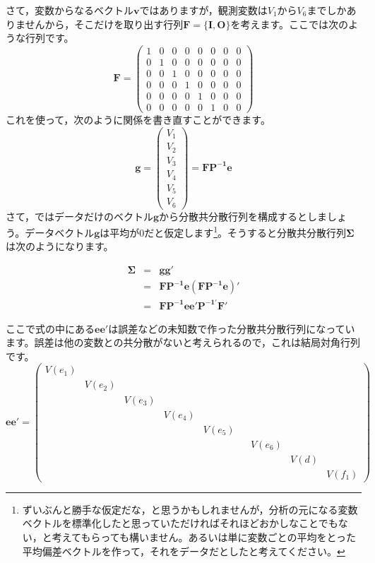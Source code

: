 \documentclass{ltjsbook}
\begin{document}
さて，変数からなるベクトル$\bm{v}$ではありますが，観測変数は$V_1$から$V_6$までしかありませんから，そこだけを取り出す行列$\bm{F}=\{ \bm{I},\bm{O} \}$を考えます。ここでは次のような行列です。
\[
	\bm{F} =
	\begin{pmatrix} 1 & 0 & 0 & 0 & 0 & 0 & 0 & 0 \\
                0 & 1 & 0 & 0 & 0 & 0 & 0 & 0 \\
                0 & 0 & 1 & 0 & 0 & 0 & 0 & 0 \\
                0 & 0 & 0 & 1 & 0 & 0 & 0 & 0 \\
                0 & 0 & 0 & 0 & 1 & 0 & 0 & 0 \\
                0 & 0 & 0 & 0 & 0 & 1 & 0 & 0\end{pmatrix}
\]
これを使って，次のように関係を書き直すことができます。
\[
	\bm{g} = \begin{pmatrix}  V_1 \\ V_2 \\ V_3 \\ V_4 \\ V_5 \\ V_6 \end{pmatrix} = \bm{FP^{-1}e}
\]
さて，ではデータだけのベクトル$\bm{g}$から分散共分散行列を構成するとしましょう。データベクトル$\bm{g}$は平均が0だと仮定します\footnote{ずいぶんと勝手な仮定だな，と思うかもしれませんが，分析の元になる変数ベクトルを標準化したと思っていただければそれほどおかしなことでもない，と考えてもらっても構いません。あるいは単に変数ごとの平均をとった平均偏差ベクトルを作って，それをデータだとしたと考えてください。}。そうすると分散共分散行列$\bm{\Sigma}$は次のようになります。

\begin{eqnarray*}
	\bm{\Sigma} &=& \bm{gg'}  \\
	& = & \bm{ F P^{-1} e ( F P^{-1} e) '} \\
	& = & \bm{ FP^{-1} ee' P^{-1'} F' }
\end{eqnarray*}

ここで式の中にある$\bm{ee'}$は誤差などの未知数で作った分散共分散行列になっています。誤差は他の変数との共分散がないと考えられるので，これは結局対角行列です。
\[
	\bm{ee'}= \begin{pmatrix}  V(e_1) &        &        &        &        &  &        &      &        \\
                        & V(e_2) &        &        &        &  &        &      &        \\
                        &        & V(e_3) &        &        &  &        &      &        \\
                        &        &        & V(e_4) &        &  &        &      &        \\
                        &        &        &        & V(e_5) &  &        &      &        \\
                        &        &        &        &        &  & V(e_6) &      &        \\
                        &        &        &        &        &  &        & V(d) &        \\
                        &        &        &        &        &  &        &      & V(f_1)\end{pmatrix}
\]
\end{document}
